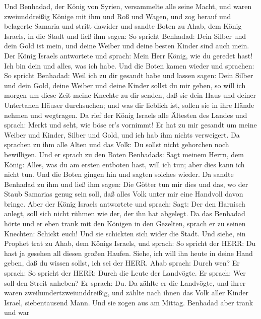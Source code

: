  Und Benhadad, der König von Syrien, versammelte alle seine
Macht, und waren zweiunddreißig Könige mit ihm und Roß und Wagen, und
zog herauf und belagerte Samaria und stritt dawider  und
sandte Boten zu Ahab, dem König Israels, in die Stadt  und
ließ ihm sagen: So spricht Benhadad: Dein Silber und dein Gold ist mein,
und deine Weiber und deine besten Kinder sind auch mein. 
Der König Israels antwortete und sprach: Mein Herr König, wie du geredet
hast! Ich bin dein und alles, was ich habe.  Und die Boten
kamen wieder und sprachen: So spricht Benhadad: Weil ich zu dir gesandt
habe und lassen sagen: Dein Silber und dein Gold, deine Weiber und deine
Kinder sollst du mir geben,  so will ich morgen um diese
Zeit meine Knechte zu dir senden, daß sie dein Haus und deiner
Untertanen Häuser durchsuchen; und was dir lieblich ist, sollen sie in
ihre Hände nehmen und wegtragen.  Da rief der König Israels
alle Ältesten des Landes und sprach: Merkt und seht, wie böse er's
vornimmt! Er hat zu mir gesandt um meine Weiber und Kinder, Silber und
Gold, und ich hab ihm nichts verweigert.  Da sprachen zu ihm
alle Alten und das Volk: Du sollst nicht gehorchen noch bewilligen.
 Und er sprach zu den Boten Benhadads: Sagt meinem Herrn,
dem König: Alles, was du am ersten entboten hast, will ich tun; aber
dies kann ich nicht tun. Und die Boten gingen hin und sagten solches
wieder.  Da sandte Benhadad zu ihm und ließ ihm sagen: Die
Götter tun mir dies und das, wo der Staub Samarias genug sein soll, daß
alles Volk unter mir eine Handvoll davon bringe.  Aber der
König Israels antwortete und sprach: Sagt: Der den Harnisch anlegt, soll
sich nicht rühmen wie der, der ihn hat abgelegt.  Da das
Benhadad hörte und er eben trank mit den Königen in den Gezelten, sprach
er zu seinen Knechten: Schickt euch! Und sie schickten sich wider die
Stadt.  Und siehe, ein Prophet trat zu Ahab, dem Königs
Israels, und sprach: So spricht der HERR: Du hast ja gesehen all diesen
großen Haufen. Siehe, ich will ihn heute in deine Hand geben, daß du
wissen sollst, ich sei der HERR.  Ahab sprach: Durch wen?
Er sprach: So spricht der HERR: Durch die Leute der Landvögte. Er
sprach: Wer soll den Streit anheben? Er sprach: Du.  Da
zählte er die Landvögte, und ihrer waren zweihundertzweiunddreißig, und
zählte nach ihnen das Volk aller Kinder Israel, siebentausend Mann.
 Und sie zogen aus am Mittag. Benhadad aber trank und war
